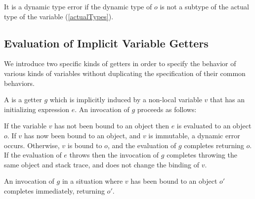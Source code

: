 \documentclass[makeidx]{article}
\begin{document}


\LMHash{}%
It is a dynamic type error if the dynamic type of $o$ is not
a subtype of the actual type of the variable \id{}
(\ref{actualTypes}).


\subsection{Evaluation of Implicit Variable Getters}

\LMHash{}%
We introduce two specific kinds of getters in order to specify
the behavior of various kinds of variables
without duplicating the specification of their common behaviors.

\LMHash{}%
A
is a getter $g$ which is implicitly induced by a non-local variable $v$
that has an initializing expression $e$.
An invocation of $g$ proceeds as follows:

\LMHash{}%
If the variable $v$ has not been bound to an object then
$e$ is evaluated to an object $o$.
If $v$ has now been bound to an object, and $v$ is immutable,
a dynamic error occurs. %
Otherwise, $v$ is bound to $o$,
and the evaluation of $g$ completes returning $o$.
If the evaluation of $e$ throws then
the invocation of $g$ completes throwing the same object and stack trace,
and does not change the binding of $v$.

\LMHash{}%
An invocation of $g$ in a situation where $v$ has been bound to an object $o'$
completes immediately, returning $o'$.

\end{document}
